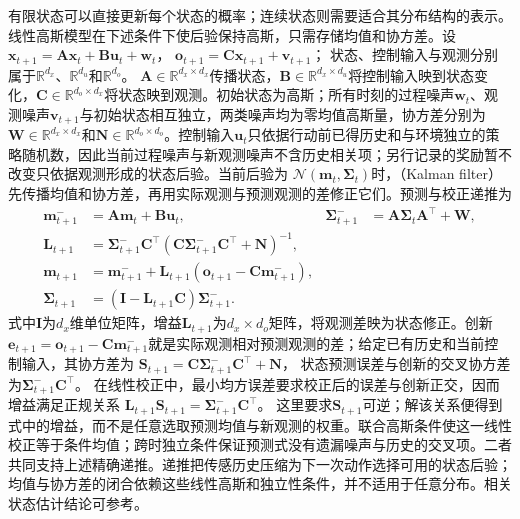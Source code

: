 有限状态可以直接更新每个状态的概率；连续状态则需要适合其分布结构的表示。线性高斯模型在下述条件下使后验保持高斯，只需存储均值和协方差。设
$\bm x_{t+1}=\bm A\bm x_t+\bm B\bm u_t+\bm w_t$，
$\bm o_{t+1}=\bm C\bm x_{t+1}+\bm v_{t+1}$；
状态、控制输入与观测分别属于$\mathbb R^{d_x}$、$\mathbb R^{d_u}$和$\mathbb R^{d_o}$。
$\bm A\in\mathbb R^{d_x\times d_x}$传播状态，$\bm B\in\mathbb R^{d_x\times d_u}$将控制输入映到状态变化，$\bm C\in\mathbb R^{d_o\times d_x}$将状态映到观测。初始状态为高斯；所有时刻的过程噪声$\bm w_t$、观测噪声$\bm v_{t+1}$与初始状态相互独立，两类噪声均为零均值高斯量，协方差分别为$\bm W\in\mathbb R^{d_x\times d_x}$和$\bm N\in\mathbb R^{d_o\times d_o}$。控制输入$\bm u_t$只依据行动前已得历史和与环境独立的策略随机数，因此当前过程噪声与新观测噪声不含历史相关项；另行记录的奖励暂不改变只依据观测形成的状态后验。当前后验为
$\mathcal N(\bm m_t,\bm\Sigma_t)$时，（Kalman filter）先传播均值和协方差，再用实际观测与预测观测的差修正它们。预测与校正递推为
\begin{align}
  \label{eq:rl-information-kalman}
  \bm m^-_{t+1}&=\bm A\bm m_t+\bm B\bm u_t,&
  \bm\Sigma^-_{t+1}&=\bm A\bm\Sigma_t\bm A^\top+\bm W,\nonumber\\
  \bm L_{t+1}&=\bm\Sigma^-_{t+1}\bm C^\top
     (\bm C\bm\Sigma^-_{t+1}\bm C^\top+\bm N)^{-1},\nonumber\\
  \bm m_{t+1}&=\bm m^-_{t+1}
       +\bm L_{t+1}(\bm o_{t+1}-\bm C\bm m^-_{t+1}),\nonumber\\
  \bm\Sigma_{t+1}&=(\bm I-\bm L_{t+1}\bm C)\bm\Sigma^-_{t+1}.
\end{align}
式中$\bm I$为$d_x$维单位矩阵，增益$\bm L_{t+1}$为$d_x\times d_o$矩阵，将观测差映为状态修正。创新$\bm e_{t+1}=\bm o_{t+1}-\bm C\bm m^-_{t+1}$就是实际观测相对预测观测的差；给定已有历史和当前控制输入，其协方差为
$\bm S_{t+1}=\bm C\bm\Sigma^-_{t+1}\bm C^\top+\bm N$，
状态预测误差与创新的交叉协方差为$\bm\Sigma^-_{t+1}\bm C^\top$。
在线性校正中，最小均方误差要求校正后的误差与创新正交，因而增益满足正规关系
$\bm L_{t+1}\bm S_{t+1}=\bm\Sigma^-_{t+1}\bm C^\top$。
这里要求$\bm S_{t+1}$可逆；解该关系便得到式中的增益，而不是任意选取预测均值与新观测的权重。联合高斯条件使这一线性校正等于条件均值；跨时独立条件保证预测式没有遗漏噪声与历史的交叉项。二者共同支持上述精确递推。递推把传感历史压缩为下一次动作选择可用的状态后验；均值与协方差的闭合依赖这些线性高斯和独立性条件，并不适用于任意分布。相关状态估计结论可参考。

